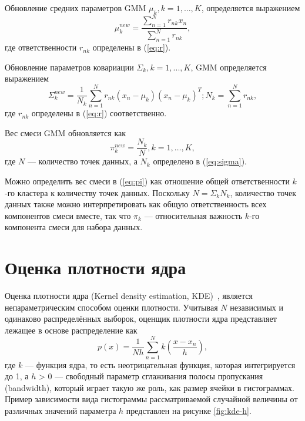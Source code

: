 Обновление средних параметров GMM $\mu_k, k = 1, \dots, K$, определяется выражением
\begin{equation}\label{eq:mu}
	\mu_k^{new} = \frac{\sum_{n=1}^{N}r_{nk}x_n}{\sum_{n=1}^{N}r_{nk}},
\end{equation}
где ответственности $r_{nk}$ определены в (\ref{eq:r}).~\cite{math}

Обновление параметров ковариации $\Sigma_k, k = 1, ..., K$, GMM определяется выражением
\begin{equation}\label{eq:sigma}
	\Sigma_k^{new} = \frac{1}{N_k}\sum_{n=1}^{N}r_{nk}(x_n - \mu_k)(x_n - \mu_k)^T; N_k = \sum_{n=1}^{N}r_{nk},
\end{equation}
где $r_{nk}$ определены в (\ref{eq:r}) соответственно.~\cite{math}

Вес смеси GMM обновляется как
\begin{equation}\label{eq:pi}
	\pi_k^{new} = \frac{N_k}{N}, k = 1, \dots, K,
\end{equation}
где $N$ --- количество точек данных, а $N_k$ определено в (\ref{eq:sigma}).~\cite{math}

Можно определить вес смеси в (\ref{eq:pi}) как отношение общей ответственности $k$-го кластера к количеству точек данных. Поскольку $N = \Sigma_k N_k$, количество точек данных также можно интерпретировать как общую ответственность всех компонентов смеси вместе, так что $\pi_k$ --- относительная важность $k$-го компонента смеси для набора данных.~\cite{math}



\section{Оценка плотности ядра}

Оценка плотности ядра (Kernel density estimation, KDE)~\cite{rosenblatt, parzen}, является непараметрическим способом оценки плотности. Учитывая $N$ независимых и одинаково распределённых выборок, оценщик плотности ядра представляет лежащее в основе распределение как
\begin{equation}
	p(x) = \frac{1}{Nh}\sum_{n=1}^{N}k(\frac{x-x_n}{h}),
\end{equation}
где $k$ --- функция ядра, то есть неотрицательная функция, которая интегрируется до 1, а $h$ > 0 --- свободный параметр сглаживания полосы пропускания (bandwidth), который играет такую же роль, как размер ячейки в гистограммах. Пример зависимости вида гистограммы рассматриваемой случайной величины от различных значений параметра $h$ представлен на рисунке \ref{fig:kde-h}.~\cite{math}

